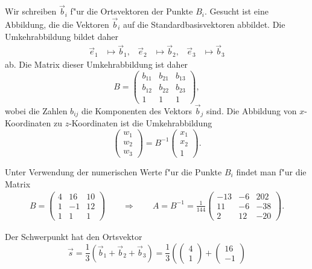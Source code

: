 \begin{loesung}
\begin{teilaufgaben}
\item
Wir schreiben $\vec b_i$ f"ur die Ortsvektoren der Punkte $B_i$.
Gesucht ist eine Abbildung, die die Vektoren $\vec b_i$ auf die
Standardbasisvektoren abbildet.
Die Umkehrabbildung bildet daher
\[
\begin{aligned}
\vec e_1&\mapsto\vec b_1,&
\vec e_2&\mapsto\vec b_2,&
\vec e_3&\mapsto\vec b_3
\end{aligned}
\]
ab.
Die Matrix dieser Umkehrabbildung ist daher
\[
B
=
\begin{pmatrix}
b_{11}&b_{21}&b_{13}\\
b_{12}&b_{22}&b_{23}\\
     1&     1&     1
\end{pmatrix},
\]
wobei die Zahlen $b_{ij}$ die Komponenten des Vektors $\vec b_j$ sind.
Die Abbildung von $x$-Koordinaten zu $z$-Koordinaten ist die Umkehrabbildung
\[
\begin{pmatrix}
w_1\\w_2\\w_3
\end{pmatrix}
=
B^{-1}\begin{pmatrix}
x_1\\x_2\\1
\end{pmatrix}.
\]
\item
Unter Verwendung der numerischen Werte f"ur die Punkte $B_i$ findet man f"ur
die Matrix
\begin{align*}
B=\begin{pmatrix}
 4&16&10\\
 1&-1&12\\
 1& 1& 1
\end{pmatrix}
\qquad
\Rightarrow
\qquad
A=
B^{-1}=\frac1{144}\begin{pmatrix}
-13&-6&202\\
 11&-6&-38\\
  2&12&-20
\end{pmatrix}.
\end{align*}
\item
Der Schwerpunkt hat den Ortsvektor
\[
\vec s = \frac13(\vec b_1+\vec b_2+\vec b_3)
=
\frac13\left(
\begin{pmatrix}  4\\ 1 \end{pmatrix}
+
\begin{pmatrix} 16\\-1 \end{pmatrix}
\]
\end{teilaufgaben}
\end{loesung}
